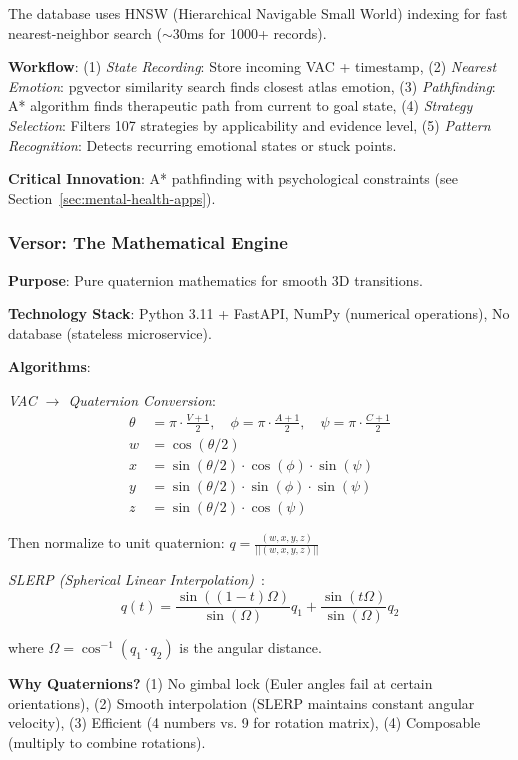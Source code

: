 The database uses HNSW (Hierarchical Navigable Small World) indexing for fast nearest-neighbor search ($\sim$30ms for 1000+ records).

\textbf{Workflow}: (1) \textit{State Recording}: Store incoming VAC + timestamp, (2) \textit{Nearest Emotion}: pgvector similarity search finds closest atlas emotion, (3) \textit{Pathfinding}: A* algorithm finds therapeutic path from current to goal state, (4) \textit{Strategy Selection}: Filters 107 strategies by applicability and evidence level, (5) \textit{Pattern Recognition}: Detects recurring emotional states or stuck points.

\textbf{Critical Innovation}: A* pathfinding with psychological constraints (see Section~\ref{sec:mental-health-apps}).

\subsubsection{Versor: The Mathematical Engine}

\textbf{Purpose}: Pure quaternion mathematics for smooth 3D transitions.

\textbf{Technology Stack}: Python 3.11 + FastAPI, NumPy (numerical operations), No database (stateless microservice).

\textbf{Algorithms}:

\textit{VAC $\rightarrow$ Quaternion Conversion}:
\begin{align}
\theta &= \pi \cdot \frac{V + 1}{2}, \quad
\phi = \pi \cdot \frac{A + 1}{2}, \quad
\psi = \pi \cdot \frac{C + 1}{2} \\
w &= \cos(\theta/2) \\
x &= \sin(\theta/2) \cdot \cos(\phi) \cdot \sin(\psi) \\
y &= \sin(\theta/2) \cdot \sin(\phi) \cdot \sin(\psi) \\
z &= \sin(\theta/2) \cdot \cos(\psi)
\end{align}

Then normalize to unit quaternion: $q = \frac{(w, x, y, z)}{||(w, x, y, z)||}$

\textit{SLERP (Spherical Linear Interpolation)}~\cite{shoemake1985}:
$$q(t) = \frac{\sin((1-t)\Omega)}{\sin(\Omega)} q_1 + \frac{\sin(t\Omega)}{\sin(\Omega)} q_2$$

where $\Omega = \cos^{-1}(q_1 \cdot q_2)$ is the angular distance.

\textbf{Why Quaternions?} (1) No gimbal lock (Euler angles fail at certain orientations), (2) Smooth interpolation (SLERP maintains constant angular velocity), (3) Efficient (4 numbers vs. 9 for rotation matrix), (4) Composable (multiply to combine rotations).

